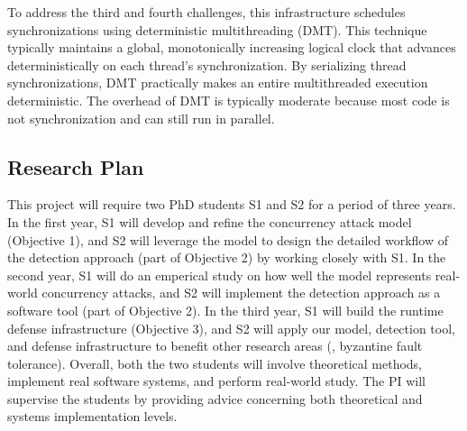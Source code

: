  To address the third and fourth challenges, 
this infrastructure schedules synchronizations 
using deterministic multithreading (DMT). This technique typically maintains a 
global, monotonically increasing logical clock that advances deterministically 
on each thread's synchronization. By serializing thread synchronizations, DMT 
practically makes an entire multithreaded execution deterministic. The overhead
of DMT is typically moderate because most code is not synchronization and can 
still run in parallel.

\vspace{-.15in}\subsection{Research Plan} \label{sec:plan}\vspace{-.075in}

This \xxx project will require two PhD students S1 and S2 for a period of 
three years. In the first year, S1 will develop and refine the concurrency 
attack model (Objective 1), and S2 will leverage the model to design the 
detailed workflow of the detection approach (part of Objective 2) by working 
closely with S1. In the second year, S1 will do an emperical study on how well 
the model represents real-world concurrency attacks, and S2 will implement 
the detection approach as a software tool (part of Objective 2). In the third 
year, S1 will build the runtime defense infrastructure (Objective 3), and S2 
will apply our model, detection tool, and defense infrastructure to benefit 
other research areas (\eg, byzantine fault tolerance). Overall, both the two 
students will involve theoretical methods, implement real software systems, and 
perform real-world study. The PI will supervise the students by providing 
advice 
concerning both theoretical and systems implementation levels.


